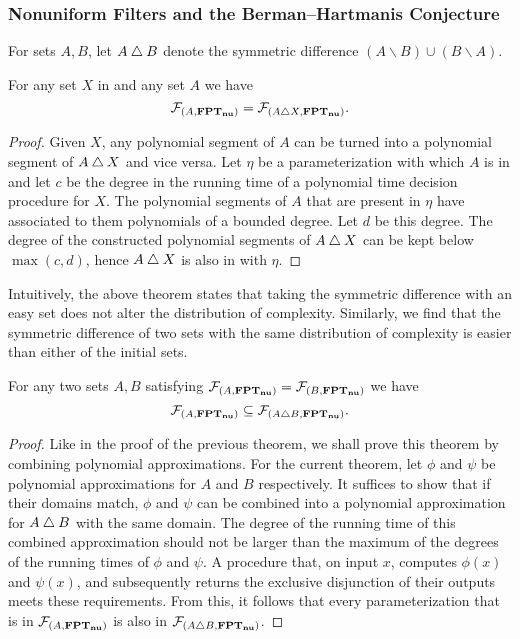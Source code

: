 \subsubsection{Nonuniform Filters and the Berman--Hartmanis Conjecture}
For sets $A, B$, let $A \bigtriangleup B$ denote the symmetric difference $(A \backslash B) \cup (B \backslash A)$.
\begin{theorem}
\label{thm:nufptsymdiffeq}
  For any set $X$ in  and any set $A$ we have
  \begin{equation*}
    \mathcal{F}_{(A, \textnormal{\textbf{FPT$_\textbf{nu}$}})} = \mathcal{F}_{(A \bigtriangleup X, \textnormal{\textbf{FPT$_\textbf{nu}$}})}.
  \end{equation*}
\end{theorem}
\begin{proof}
  Given $X$, any polynomial segment of $A$ can be turned into a polynomial segment of $A \bigtriangleup X$ and vice versa.
  Let $\eta$ be a parameterization with which $A$ is in  and let $c$ be the degree in the running time of a polynomial time decision procedure for $X$.
  The polynomial segments of $A$ that are present in $\eta$ have associated to them polynomials of a bounded degree.
  Let $d$ be this degree.
  The degree of the constructed polynomial segments of $A \bigtriangleup X$ can be kept below $\max(c, d)$, hence $A \bigtriangleup X$ is also in  with $\eta$.
\end{proof}

Intuitively, the above theorem states that taking the symmetric difference with an easy set does not alter the distribution of complexity.
Similarly, we find that the symmetric difference of two sets with the same distribution of complexity is easier than either of the initial sets.
\begin{theorem}
\label{thm:nufptsymdiffsubeq}
  For any two sets $A, B$ satisfying $\mathcal{F}_{(A, \textnormal{\textbf{FPT$_\textbf{nu}$}})} = \mathcal{F}_{(B, \textnormal{\textbf{FPT$_\textbf{nu}$}})}$ we have
  \begin{equation*}
    \mathcal{F}_{(A, \textnormal{\textbf{FPT$_\textbf{nu}$}})} \subseteq \mathcal{F}_{(A \bigtriangleup B, \textnormal{\textbf{FPT$_\textbf{nu}$}})}.
  \end{equation*}
\end{theorem}
\begin{proof}
  Like in the proof of the previous theorem, we shall prove this theorem by combining polynomial approximations.
  For the current theorem, let $\phi$ and $\psi$ be polynomial approximations for $A$ and $B$ respectively.
  It suffices to show that if their domains match, $\phi$ and $\psi$ can be combined into a polynomial approximation for $A \bigtriangleup B$ with the same domain.
  The degree of the running time of this combined approximation should not be larger than the maximum of the degrees of the running times of $\phi$ and $\psi$.
  A procedure that, on input $x$, computes $\phi(x)$ and $\psi(x)$, and subsequently returns the exclusive disjunction of their outputs meets these requirements.
  From this, it follows that every parameterization that is in $\mathcal{F}_{(A, \textnormal{\textbf{FPT$_\textbf{nu}$}})}$ is also in $\mathcal{F}_{(A \bigtriangleup B, \textnormal{\textbf{FPT$_\textbf{nu}$}})}$.
\end{proof}

